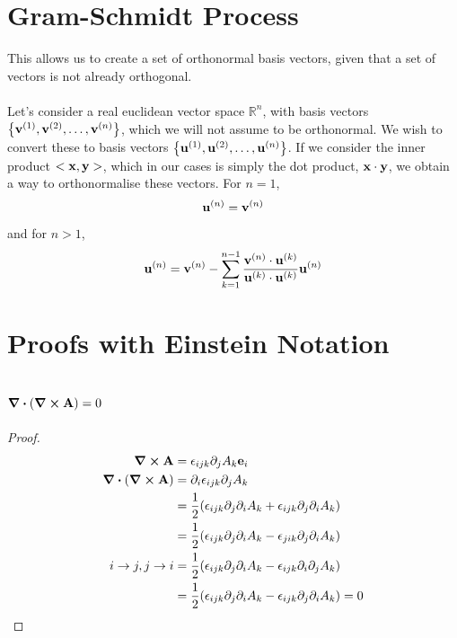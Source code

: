 \documentclass{book}
\begin{document}
\chapter{Gram-Schmidt Process}
This allows us to create a set of orthonormal basis vectors, given that a set of vectors is not already orthogonal.
\\\\
Let's consider a real euclidean vector space $\mathbb{R}^n$, with basis vectors $\left\{\vb{v}^{(1)},\vb{v}^{(2)},\ldots,\vb{v}^{(n)}\right\}$, which we will not assume to be orthonormal. We wish to convert these to basis vectors $\left\{\vb{u}^{(1)},\vb{u}^{(2)},\ldots,\vb{u}^{(n)}\right\}$. If we consider the inner product $<\vb{x},\vb{y}>$, which in our cases is simply the dot product, $\vb{x}\cdot\vb{y}$, we obtain a way to orthonormalise these vectors. For $n=1$,
\begin{equation}
    \vb{u}^{(n)} = \vb{v}^{(n)}
\end{equation}
and for $n > 1$,
\begin{equation}
    \vb{u}^{(n)} = \vb{v}^{(n)} - \sum_{k=1}^{n-1}\frac{\vb{v}^{(n)}\cdot\vb{u}^{(k)}}{\vb{u}^{(k)}\cdot\vb{u}^{(k)}}\vb{u}^{(n)}
\end{equation}
\chapter{Proofs with Einstein Notation}
\section{$\div{(\curl{\vb{A}})} = 0$}
\begin{proof}
    \begin{equation*}
    \begin{split}
        \curl{\vb{A}} & = \epsilon_{ijk}\partial_jA_k\vb{e}_i \\
        \div{(\curl{\vb{A}})} & = \partial_i\epsilon_{ijk}\partial_jA_k \\
        & = \frac{1}{2}(\epsilon_{ijk}\partial_j\partial_iA_k + \epsilon_{ijk}\partial_j\partial_iA_k) \\
        & = \frac{1}{2}(\epsilon_{ijk}\partial_j\partial_iA_k - \epsilon_{jik}\partial_j\partial_iA_k) \\
        i\to j, j \to i & = \frac{1}{2}(\epsilon_{ijk}\partial_j\partial_iA_k - \epsilon_{ijk}\partial_i\partial_jA_k) \\
        & = \frac{1}{2}(\epsilon_{ijk}\partial_j\partial_iA_k - \epsilon_{ijk}\partial_j\partial_iA_k) = 0
    \end{split}
    \end{equation*}
\end{proof}
\end{document}
